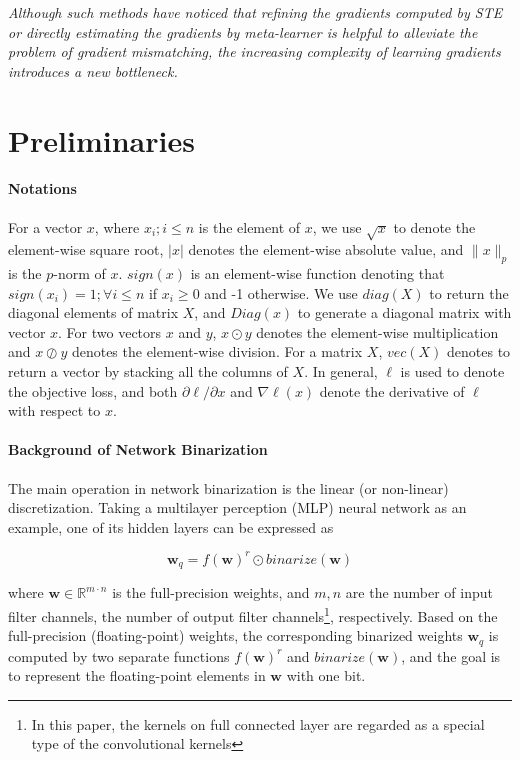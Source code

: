 \documentclass[runningheads]{llncs}
\begin{document}
\emph{Although such methods have noticed that refining the gradients computed by STE
or directly estimating the gradients by meta-learner is helpful to alleviate the problem of gradient mismatching,
the increasing complexity of learning gradients introduces a new bottleneck.}

\section{Preliminaries}
\paragraph{\textbf{Notations}}
For a vector $x$, where $x_i; i \leq n$ is the element of $x$,
we use $\sqrt{x}$ to denote the element-wise square root,
$|x|$ denotes the element-wise absolute value,
and $\|x\|_p$ is the $p$-norm of $x$.
$sign(x)$ is an element-wise function denoting that
$sign(x_i)=1; \forall i \leq n$ if $x_i \geq 0$ and -1 otherwise.
We use $diag(X)$ to return the diagonal elements of matrix $X$,
and $Diag(x)$ to generate a diagonal matrix with vector $x$.
For two vectors $x$ and $y$,
$x \odot y$ denotes the element-wise multiplication
and $x \oslash y$ denotes the element-wise division.
For a matrix $X$, $vec(X)$ denotes to return a vector by stacking all the columns of $X$.
In general, $\ell$ is used to denote the objective loss,
and both $\partial \ell / \partial x$ and $\nabla \ell (x)$ denote
the derivative of $\ell$ with respect to $x$.

\paragraph{\textbf{Background of Network Binarization}}
The main operation in network binarization is the linear (or non-linear) discretization.
Taking a multilayer perception (MLP) neural network as an example, one of its hidden layers can be expressed as

\begin{equation}\label{eq:binary_basic}
\textbf{w}_q = f(\textbf{w})^r \odot binarize(\textbf{w})
\end{equation}

where $\textbf{w} \in \mathbb{R}^{m \cdot n}$ is the full-precision weights,
and $m, n$ are the number of input filter channels, the number of output filter channels\footnote{In this paper,
the kernels on full connected layer are regarded as a special type of the convolutional kernels}, respectively.
Based on the full-precision (floating-point) weights, the corresponding binarized weights $\textbf{w}_q$
is computed by two separate functions $f(\textbf{w})^r$ and $binarize(\textbf{w})$,
and the goal is to represent the floating-point elements in $\textbf{w}$ with one bit.
\end{document}
